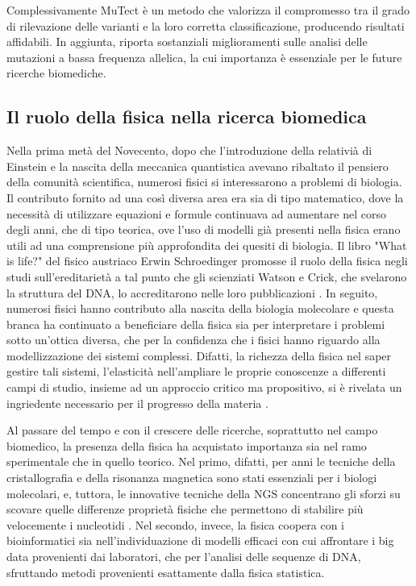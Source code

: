 Complessivamente MuTect è un metodo che valorizza il compromesso tra il grado di rilevazione delle varianti e la loro corretta classificazione, producendo risultati affidabili.
In aggiunta, riporta sostanziali miglioramenti sulle analisi delle mutazioni a bassa frequenza allelica, la cui importanza è essenziale per le future ricerche biomediche.

\subsection{Il ruolo della fisica nella ricerca biomedica}
Nella prima metà del Novecento, dopo che l'introduzione della relativià di Einstein e la nascita della meccanica quantistica avevano ribaltato il pensiero della comunità scientifica, numerosi fisici si interessarono a problemi di biologia.
Il contributo fornito ad una così diversa area era sia di tipo matematico, dove la necessità di utilizzare equazioni e formule continuava ad aumentare nel corso degli anni, che di tipo teorica, ove l'uso di modelli già presenti nella fisica erano utili ad una comprensione più approfondita dei quesiti di biologia.
Il libro "What is life?" del fisico austriaco Erwin Schroedinger promosse il ruolo della fisica negli studi sull'ereditarietà a tal punto che gli scienziati Watson e Crick, che svelarono la struttura del DNA, lo accreditarono nelle loro pubblicazioni \cite{2058-7058-12-9-22}.
In seguito, numerosi fisici hanno contributo alla nascita della biologia molecolare e questa branca ha continuato a beneficiare della fisica sia per interpretare i problemi sotto un'ottica diversa, che per la confidenza che i fisici hanno riguardo alla modellizzazione dei sistemi complessi.
Difatti, la richezza della fisica nel saper gestire tali sistemi, l'elasticità nell'ampliare le proprie conoscenze a differenti campi di studio, insieme ad un approccio critico ma propositivo, si è rivelata un ingriedente necessario per il progresso della materia \cite{Pooley2005}.

Al passare del tempo e con il crescere delle ricerche, soprattutto nel campo biomedico, la presenza della fisica ha acquistato importanza sia nel ramo sperimentale che in quello teorico.
Nel primo, difatti, per anni le tecniche della cristallografia e della risonanza magnetica sono stati essenziali per i biologi molecolari, e, tuttora, le innovative tecniche della NGS concentrano gli sforzi su scovare quelle differenze proprietà fisiche che permettono di stabilire più velocemente i nucleotidi \cite{Zwolak2008}.
Nel secondo, invece, la fisica coopera con i bioinformatici sia nell'individuazione di modelli efficaci con cui affrontare i big data provenienti dai laboratori, che per l'analisi delle sequenze di DNA, sfruttando metodi provenienti esattamente dalla fisica statistica.

